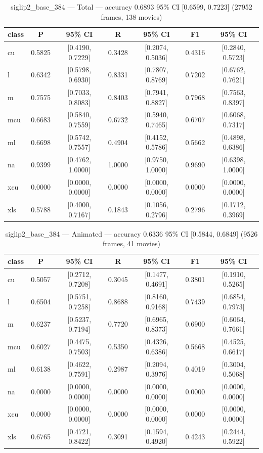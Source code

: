 \begin{table}[htbp]
\centering
\caption{siglip2\_base\_384 — Total — accuracy 0.6893 95\% CI [0.6599, 0.7223] (27952 frames, 138 movies)}
\label{tab:siglip2-base-384-total}
\begin{tabular}{lcccccc}
\toprule
class & P & 95\% CI & R & 95\% CI & F1 & 95\% CI \\
\midrule
cu & 0.5825 & [0.4190, 0.7229] & 0.3428 & [0.2074, 0.5036] & 0.4316 & [0.2840, 0.5723] \\
l & 0.6342 & [0.5798, 0.6930] & 0.8331 & [0.7807, 0.8769] & 0.7202 & [0.6762, 0.7621] \\
m & 0.7575 & [0.7033, 0.8083] & 0.8403 & [0.7941, 0.8827] & 0.7968 & [0.7563, 0.8397] \\
mcu & 0.6683 & [0.5840, 0.7559] & 0.6732 & [0.5940, 0.7465] & 0.6707 & [0.6068, 0.7317] \\
ml & 0.6698 & [0.5742, 0.7557] & 0.4904 & [0.4152, 0.5786] & 0.5662 & [0.4898, 0.6386] \\
na & 0.9399 & [0.4762, 1.0000] & 1.0000 & [0.9750, 1.0000] & 0.9690 & [0.6398, 1.0000] \\
xcu & 0.0000 & [0.0000, 0.0000] & 0.0000 & [0.0000, 0.0000] & 0.0000 & [0.0000, 0.0000] \\
xls & 0.5788 & [0.4000, 0.7167] & 0.1843 & [0.1056, 0.2796] & 0.2796 & [0.1712, 0.3969] \\
\bottomrule
\end{tabular}
\end{table}

\begin{table}[htbp]
\centering
\caption{siglip2\_base\_384 — Animated — accuracy 0.6336 95\% CI [0.5844, 0.6849] (9526 frames, 41 movies)}
\label{tab:siglip2-base-384-animated}
\begin{tabular}{lcccccc}
\toprule
class & P & 95\% CI & R & 95\% CI & F1 & 95\% CI \\
\midrule
cu & 0.5057 & [0.2712, 0.7208] & 0.3045 & [0.1477, 0.4691] & 0.3801 & [0.1910, 0.5265] \\
l & 0.6504 & [0.5751, 0.7258] & 0.8688 & [0.8160, 0.9168] & 0.7439 & [0.6854, 0.7973] \\
m & 0.6237 & [0.5237, 0.7194] & 0.7720 & [0.6965, 0.8373] & 0.6900 & [0.6064, 0.7661] \\
mcu & 0.6027 & [0.4475, 0.7503] & 0.5350 & [0.4326, 0.6386] & 0.5668 & [0.4525, 0.6617] \\
ml & 0.6138 & [0.4622, 0.7591] & 0.2987 & [0.2094, 0.3976] & 0.4019 & [0.3004, 0.5068] \\
na & 0.0000 & [0.0000, 0.0000] & 0.0000 & [0.0000, 0.0000] & 0.0000 & [0.0000, 0.0000] \\
xcu & 0.0000 & [0.0000, 0.0000] & 0.0000 & [0.0000, 0.0000] & 0.0000 & [0.0000, 0.0000] \\
xls & 0.6765 & [0.4721, 0.8422] & 0.3091 & [0.1594, 0.4920] & 0.4243 & [0.2444, 0.5922] \\
\bottomrule
\end{tabular}
\end{table}

